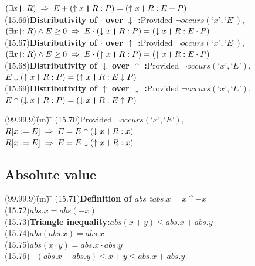 \documentclass{amsart}
\newcommand{\lgap}{2pt}                             %
\newcommand{\impls}{\ensuremath{\;\Rightarrow\;}}   %
\newcommand{\thedr}{\rule[-.25ex]{.32mm}{1.75ex}}   %
\newcommand{\dr}{\;\,\thedr\,\;}                    %
\newcommand{\rb}{:}                                 %
\newcommand{\drrb}{\;\thedr\,{:}\;}                 %
\newcommand{\ext}{\exists}                          %
\newcommand{\Lq}{\mbox{`}}
\newcommand{\Rq}{\mbox{'}}
\begin{document}
\begin{tabbing}
       \>$(\ext x\drrb R) \impls E + (\uparrow x\dr R\rb P) = (\uparrow x\dr R\rb E + P)$\\[\lgap]
(15.66)\>\textbf{Distributivity of $\cdot$ over $\downarrow$ :}\quad Provided $\neg occurs(\Lq x\Rq ,\Lq E\Rq)$,\\[\lgap]
       \>$(\ext x\drrb R) \land E\ge 0 \impls E\cdot (\downarrow x\dr R\rb P) = (\downarrow x\dr R\rb E\cdot P)$\\[\lgap]
(15.67)\>\textbf{Distributivity of $\cdot$ over $\uparrow$ :}\quad Provided $\neg occurs(\Lq x\Rq ,\Lq E\Rq)$,\\[\lgap]
       \>$(\ext x\drrb R) \land E\ge 0 \impls E\cdot (\uparrow x\dr R\rb P) = (\uparrow x\dr R\rb E\cdot P)$\\[\lgap]
(15.68)\>\textbf{Distributivity of $\downarrow$ over $\uparrow$ :}\quad Provided $\neg occurs(\Lq x\Rq ,\Lq E\Rq)$,\\[\lgap]
       \>$E\downarrow (\uparrow x\dr R\rb P) = (\uparrow x\dr R\rb E\downarrow P)$\\[\lgap]
(15.69)\>\textbf{Distributivity of $\uparrow$ over $\downarrow$ :}\quad Provided $\neg occurs(\Lq x\Rq ,\Lq E\Rq)$,\\[\lgap]
       \>$E\uparrow (\downarrow x\dr R\rb P) = (\downarrow x\dr R\rb E\uparrow P)$\\[\lgap]
\end{tabbing}

\newpage

\begin{tabbing}
(99.99.9)\;\=(m)\;\= \makebox[2in]{ } \= \kill
(15.70)\>Provided $\neg occurs(\Lq x\Rq ,\Lq E\Rq)$,\\[\lgap]
       \>$R[x := E] \impls E=E \uparrow (\downarrow x\dr R\rb x)$\\[\lgap]
       \>$R[x := E] \impls E=E \downarrow (\uparrow x\dr R\rb x)$\\[\lgap]
\end{tabbing}

\subsection*{Absolute value}
\begin{tabbing}
(99.99.9)\;\=(m)\;\= \makebox[2in]{ } \= \kill
(15.71)\>\textbf{Definition of $abs$ :}\quad $abs.x = x\uparrow -x$\\[\lgap]
(15.72)\>$abs.x = abs(-x)$\\[\lgap]
(15.73)\>\textbf{Triangle inequality:}\quad $abs(x+y) \le abs.x + abs.y$\\[\lgap]
(15.74)\>$abs(abs.x) = abs.x$\\[\lgap]
(15.75)\>$abs(x\cdot y) = abs.x\cdot abs.y$\\[\lgap]
(15.76)\>$-(abs.x + abs.y) \le x + y \le abs.x + abs.y$\\[\lgap]
\end{tabbing}
\end{document}

